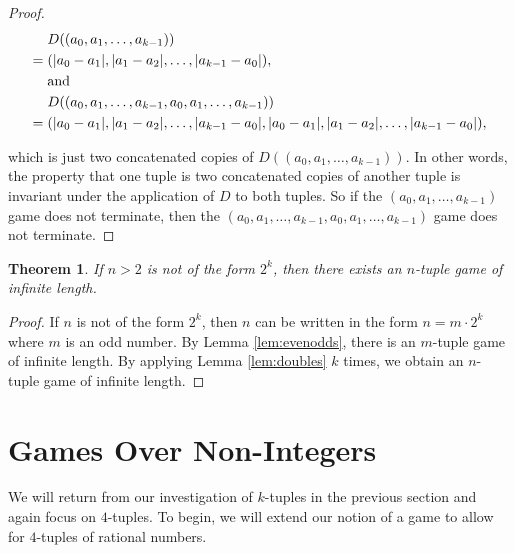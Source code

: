 \documentclass[12pt]{amsart}
\newtheorem{theorem}{Theorem}[section]
\newcommand{\diff}{D}
\begin{document}
\begin{proof}


\begin{align*}
&\diff((a_0, a_1, \ldots, a_{k-1})) \\
= \hspace{.1cm} & (|a_0 - a_1|, |a_1 - a_2|, \ldots, |a_{k-1} - a_0|), \\
& \mathrm{and}\\ 
& \diff((a_0, a_1, \ldots, a_{k-1}, a_0, a_1, \ldots, a_{k-1})) \\
= \hspace{.1cm} & (|a_0 - a_1|, |a_1 - a_2|, \ldots, |a_{k-1} - a_0|, |a_0 - a_1|, |a_1 - a_2|, \ldots, |a_{k-1} - a_0|),
\end{align*}

which is just two concatenated copies of $\diff((a_0, a_1, \ldots, a_{k-1}))$. In other words, the property that one tuple is two concatenated copies of another tuple is invariant under the application of $\diff$ to both tuples. So if the $(a_0, a_1, \ldots, a_{k-1})$ game does not terminate, then the $(a_0, a_1, \ldots, a_{k-1}, a_0, a_1, \ldots, a_{k-1})$ game does not terminate.

\end{proof}

\begin{theorem}
\label{theorem:notPowersOfTwo}
If $n > 2$ is not of the form $2^k$, then there exists an $n$-tuple game of infinite length.
\end{theorem}

\begin{proof}

If $n$ is not of the form $2^k$, then $n$ can be written in the form $n = m \cdot 2^k$ where $m$ is an odd number. By Lemma \ref{lem:evenodds}, there is an $m$-tuple game of infinite length. By applying Lemma \ref{lem:doubles} $k$ times, we obtain an $n$-tuple game of infinite length. 
\end{proof}



\section{Games Over Non-Integers\label{sec:nonIntegers}}

We will return from our investigation of $k$-tuples in the previous section and again focus on $4$-tuples. To begin, we will extend our notion of a game to allow for $4$-tuples of rational numbers.
\end{document}
